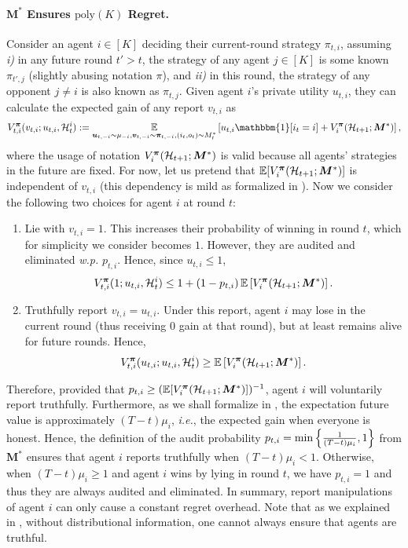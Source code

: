 \paragraph{$\bm M^\ast$ Ensures $\text{poly}(K)$ Regret.}
Consider an agent $i\in [K]$ deciding their current-round strategy $\pi_{t,i}$, assuming \textit{i)} in any future round $t'>t$, the strategy of any agent $j\in [K]$ is some known $\pi_{t',j}$ (slightly abusing notation $\pi$), and \textit{ii)} in this round, the strategy of any opponent $j\ne i$ is also known as $\pi_{t,j}$.
Given agent $i$'s private utility $u_{t,i}$, they can calculate the expected gain of any report $v_{t,i}$ as
\begin{equation*}
V_{t,i}^{\bm \pi}(v_{t,i};u_{t,i},\mH_t^i):=\E_{\bm u_{t,-i}\sim \mu_{-i},\bm v_{t,-i}\sim \bm \pi_{t,-i},(i_t,o_t)\sim M_t^\ast}\left [u_{t,i}\mathbbm{1}[i_t=i]+V_{i}^{\bm \pi}(\mH_{t+1};\bm M^\ast)\right ],
\end{equation*}
where the usage of notation $V_{i}^{\bm \pi}(\mathcal{H}_{t+1};\bm M^\ast)$ is valid because all agents' strategies in the future are fixed.
For now, let us pretend that $\E[V_{i}^{\bm \pi}(\mH_{t+1};\bm M^\ast)]$ is independent of $v_{t,i}$ (this dependency is mild as formalized in ).
Now we consider the following two choices for agent $i$ at round $t$:
\begin{enumerate}
\item Lie with $v_{t,i}=1$. This increases their probability of winning in round $t$, which for simplicity we consider becomes $1$. However, they are audited and eliminated \textit{w.p.} $p_{t,i}$. Hence, since $u_{t,i}\le 1$,
\begin{equation*}
V_{t,i}^{\bm \pi}(1;u_{t,i},\mH_t^i)\le 1+(1-p_{t,i})\E\left [V_{i}^{\bm \pi}(\mH_{t+1};\bm M^\ast)\right ].
\end{equation*}
\item Truthfully report $v_{t,i}=u_{t,i}$. Under this report, agent $i$ may lose in the current round (thus receiving 0 gain at that round), but at least remains alive for future rounds. Hence,
\begin{equation*}
V_{t,i}^{\bm \pi}(u_{t,i};u_{t,i},\mH_t^i)\ge \E\left [V_{i}^{\bm \pi}(\mH_{t+1};\bm M^\ast)\right ].
\end{equation*}
\end{enumerate}

Therefore, provided that $p_{t,i}\ge (\E[V_{i}^{\bm \pi}(\mH_{t+1};\bm M^\ast)])^{-1}$, agent $i$ will voluntarily report truthfully. Furthermore, as we shall formalize in , the expectation future value is approximately $(T-t)\mu_i$, \textit{i.e.}, the expected gain when everyone is honest. Hence, the definition of the audit probability $p_{t,i}=\min\left\{ \frac{1}{(T-t)\mu_i},1 \right\}$ from $\bm M^\ast$ ensures that agent $i$ reports truthfully when $(T-t)\mu_i<1$. Otherwise, when $(T-t)\mu_i\ge 1$ and agent $i$ wins by lying in round $t$, we have $p_{t,i}=1$ and thus they are always audited and eliminated. In summary, report manipulations of agent $i$ can only cause a constant regret overhead. Note that as we explained in , without distributional information, one cannot always ensure that agents are truthful.


